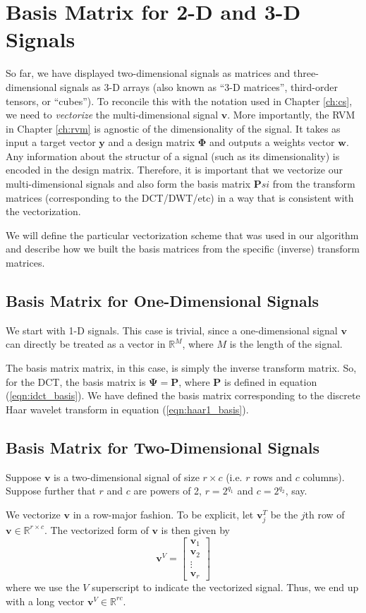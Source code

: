 \section{Basis Matrix for 2-D and 3-D Signals}
So far, we have displayed two-dimensional signals as matrices and three-dimensional signals as 3-D arrays (also known as ``3-D matrices'', third-order tensors, or ``cubes'').
To reconcile this with the notation used in Chapter \ref{ch:cs}, we need to \emph{vectorize} the multi-dimensional signal $\bm v$.
More importantly, the RVM in Chapter \ref{ch:rvm} is agnostic of the dimensionality of the signal. 
It takes as input a target vector $\bm y$ and a design matrix $\bm \Phi$ and outputs a weights vector $\bm w$.
Any information about the structur of a signal (such as its dimensionality) is encoded in the design matrix.
Therefore, it is important that we vectorize our multi-dimensional signals and also form the basis matrix $\bm Psi$ from the transform matrices (corresponding to the DCT/DWT/etc) in a way that is consistent with the vectorization.

We will define the particular vectorization scheme that was used in our algorithm and describe how we built the basis matrices from the specific (inverse) transform matrices.

\subsection{Basis Matrix for One-Dimensional Signals}
We start with 1-D signals. 
This case is trivial, since a one-dimensional signal $\bm v$ can directly be treated as a vector in $\mathbb{R}^M$, where $M$ is the length of the signal.

The basis matrix matrix, in this case, is simply the inverse transform matrix.
So, for the DCT, the basis matrix is $\bm\Psi = \bm P$, where $\bm P$ is defined in equation (\ref{eqn:idct_basis}).
We have defined the basis matrix corresponding to the discrete Haar wavelet transform in equation (\ref{eqn:haar1_basis}).

\subsection{Basis Matrix for Two-Dimensional Signals}
Suppose $\bm v$ is a two-dimensional signal of size $r\times c$ (i.e. $r$ rows and $c$ columns).
Suppose further that $r$ and $c$ are powers of 2, $r=2^{q_1}$ and $c = 2^{q_2}$, say.

We vectorize $\bm v$ in a row-major fashion.
To be explicit, let $\bm v_j^T$ be the $j$th row of $\bm v\in\mathbb{R}^{r\times c}$.
The vectorized form of $\bm v$ is then given by
\begin{equation*}
  \bm v^V = \begin{bmatrix}
    \bm v_1 \\
    \bm v_2 \\
    \vdots \\
    \bm v_r
  \end{bmatrix}
\end{equation*}
where we use the $V$ superscript to indicate the vectorized signal.
Thus, we end up with a long vector $\bm v^V \in \mathbb{R}^{rc}$.

